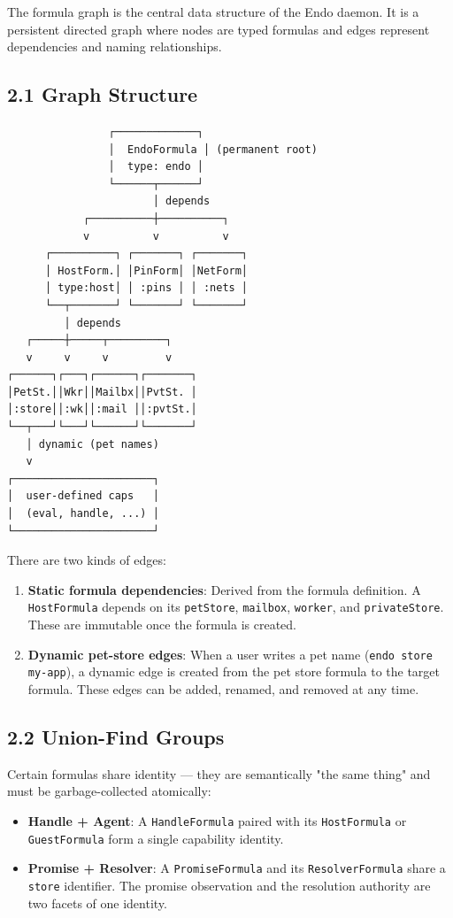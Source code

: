 \documentclass[11pt]{article}
\begin{document}
The formula graph is the central data structure of the Endo daemon. It is a
persistent directed graph where nodes are typed formulas and edges represent
dependencies and naming relationships.
\subsection{2.1 Graph Structure}
\label{sec:org2e88670}

\begin{verbatim}
                ┌─────────────┐
                │  EndoFormula │ (permanent root)
                │  type: endo │
                └──────┬──────┘
                       │ depends
            ┌──────────┼──────────┐
            v          v          v
      ┌──────────┐ ┌───────┐ ┌───────┐
      │ HostForm.│ │PinForm│ │NetForm│
      │ type:host│ │ :pins │ │ :nets │
      └──┬───────┘ └───────┘ └───────┘
         │ depends
   ┌─────┼─────┬─────────┐
   v     v     v         v
┌──────┐┌───┐┌──────┐┌───────┐
│PetSt.││Wkr││Mailbx││PvtSt. │
│:store││:wk││:mail ││:pvtSt.│
└──┬───┘└───┘└──────┘└───────┘
   │ dynamic (pet names)
   v
┌──────────────────────┐
│  user-defined caps   │
│  (eval, handle, ...) │
└──────────────────────┘
\end{verbatim}

There are two kinds of edges:

\begin{enumerate}
\item \textbf{Static formula dependencies}: Derived from the formula definition. A
\texttt{HostFormula} depends on its \texttt{petStore}, \texttt{mailbox}, \texttt{worker}, and
\texttt{privateStore}. These are immutable once the formula is created.

\item \textbf{Dynamic pet-store edges}: When a user writes a pet name (\texttt{endo store
   my-app}), a dynamic edge is created from the pet store formula to the
target formula. These edges can be added, renamed, and removed at any
time.
\end{enumerate}
\subsection{2.2 Union-Find Groups}
\label{sec:orgfeb69f0}

Certain formulas share identity --- they are semantically "the same thing"
and must be garbage-collected atomically:

\begin{itemize}
\item \textbf{Handle + Agent}: A \texttt{HandleFormula} paired with its \texttt{HostFormula} or
\texttt{GuestFormula} form a single capability identity.
\item \textbf{Promise + Resolver}: A \texttt{PromiseFormula} and its \texttt{ResolverFormula} share a
\texttt{store} identifier. The promise observation and the resolution authority
are two facets of one identity.
\end{itemize}
\end{document}
